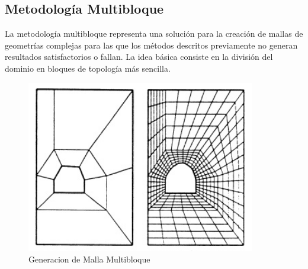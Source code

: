 \documentclass{article}
\begin{document}
\subsection{Metodología Multibloque}
La metodología multibloque representa una solución para la creación de mallas de geometrías complejas para las que los métodos descritos previamente no generan resultados satisfactorios o fallan. La idea
básica consiste en la división del dominio en bloques de topología más sencilla. \cite{bugeda1990utilizacion,perazzo2006avances}

\begin{figure}[h!]
\centering
\includegraphics[width=10cm]{MallaMultibloque}
\caption{Generacion de Malla Multibloque}
\label{fig:Malla Multibloque}
\end{figure}



\end{document}
